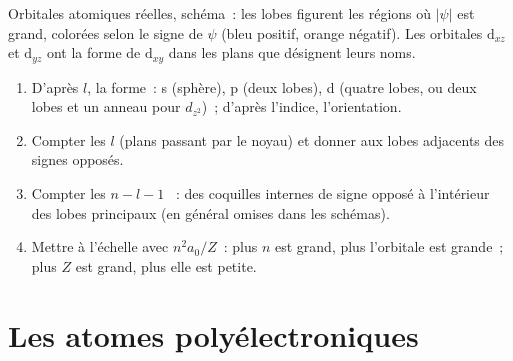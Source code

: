 \begin{omfigure}

{\small Orbitales atomiques réelles, schéma~: les lobes figurent les régions où $|\psi|$
est grand, colorées selon le signe de $\psi$ (bleu positif, orange négatif). Les
orbitales $\mathrm d_{xz}$ et $\mathrm d_{yz}$ ont la forme de $\mathrm d_{xy}$ dans
les plans que désignent leurs noms.}
\end{omfigure}

\begin{method}\label{met:b2:atomic-orbitals:draw-orbital}
\begin{enumerate}
  \item D'après $l$, la forme~: s (sphère), p (deux lobes), d (quatre lobes, ou deux
        lobes et un anneau pour $d_{z^2}$)~; d'après l'indice, l'orientation.
  \item Compter les $l$  (plans passant par le noyau) et donner
        aux lobes adjacents des signes opposés.
  \item Compter les $n - l - 1$ ~: des coquilles internes de signe opposé à l'intérieur
        des lobes principaux (en général omises dans les schémas).
  \item Mettre à l'échelle avec $n^2a_0/Z$~: plus $n$ est grand, plus l'orbitale est grande~; plus $Z$ est grand, plus elle est petite.
\end{enumerate}
\end{method}

\section{Les atomes polyélectroniques}

